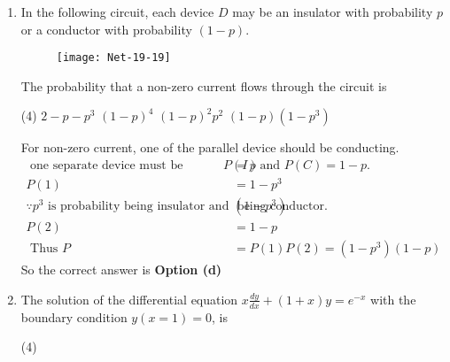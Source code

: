 \begin{enumerate}
\begin{answer}
\begin{align*}
\begin{array}{lll}
	\end{array}\right]\\
	\text { For calculating eigen values }&\left|\begin{array}{ccc}
	1-\lambda & 2 & 3 \\
	2 & 4-\lambda & 6 \\
	3 & 6 & 9-\lambda
	\end{array}\right|=0\\
	(1-\lambda)[(4-\lambda)(9-\lambda)&-36]-2[2(9-\lambda)-18]+3(12-3(4-\lambda))=0\\
	\Rightarrow-\lambda^{3}+\lambda^{2} \cdot &14=0 \Rightarrow \lambda^{2}(-\lambda+14)=0 \quad \Rightarrow \lambda=0,0,14
	\intertext{Also, directly for a $3 \times 3$ matrix we can write $(0,0$, Trace of $\mathrm{A})$ as Eigen values.}
	\end{align*}
		So the correct answer is \textbf{Option (c)}
\end{answer}
\item In the following circuit, each device $D$ may be an insulator with probability $p$ or a conductor with probability $(1-p)$.
\begin{figure}[H]
	\centering
	\texttt{[image: Net-19-19]}
\end{figure}
The probability that a non-zero current flows through the circuit is
 \begin{tasks}(4)
	\task[\textbf{a.}] $2-p-p^{3}$
	\task[\textbf{b.}] $(1-p)^{4}$
	\task[\textbf{c.}] $(1-p)^{2} p^{2}$
	\task[\textbf{d.}] $(1-p)\left(1-p^{3}\right)$
\end{tasks}
\begin{answer}
	For non-zero current, one of the parallel device should be conducting.
	\begin{align*}
	\text { one separate device must be conducting with } P(I)&=p \text { and } P(C)=1-p \text {. }\\
	P(1)&=1-p^{3}\\
	\because p^{3} \text { is probability being insulator and }\left(1-p^{3}\right)& \text { being conductor. }\\
	P(2)&=1-p\\
\text{	Thus }P&=P(1) P(2)=\left(1-p^{3}\right)(1-p)
	\end{align*}
		So the correct answer is \textbf{Option (d)}
\end{answer}
\item The solution of the differential equation $x \frac{d y}{d x}+(1+x) y=e^{-x}$ with the boundary condition $y(x=1)=0$, is
 \begin{tasks}(4)

\end{tasks}
\end{enumerate}

